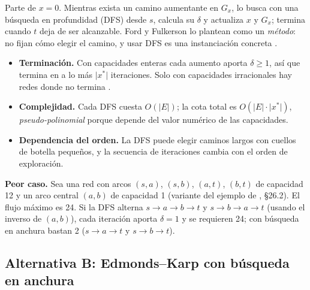 \documentclass[12pt, a4paper]{article}
\begin{document}
Parte de $x = 0$. Mientras exista un camino aumentante en $G_x$, lo busca con una búsqueda en profundidad (DFS) desde $s$, calcula su $\delta$ y actualiza $x$ y $G_x$; termina cuando $t$ deja de ser alcanzable. Ford y Fulkerson \cite{ford1956} lo plantean como un \emph{método}: no fijan cómo elegir el camino, y usar DFS es una instanciación concreta \cite{clrs2009}.
\begin{itemize}
  \item \textbf{Terminación.} Con capacidades enteras cada aumento aporta $\delta \ge 1$, así que termina en a lo más $\lvert x^*\rvert$ iteraciones. Solo con capacidades irracionales hay redes donde no termina \cite{kleinberg2006}.
  \item \textbf{Complejidad.} Cada DFS cuesta $O(\lvert E\rvert)$; la cota total es $O(\lvert E\rvert \cdot \lvert x^*\rvert)$, \emph{pseudo-polinomial} porque depende del valor numérico de las capacidades.
  \item \textbf{Dependencia del orden.} La DFS puede elegir caminos largos con cuellos de botella pequeños, y la secuencia de iteraciones cambia con el orden de exploración.
\end{itemize}
\textbf{Peor caso.} Sea una red con arcos $(s,a)$, $(s,b)$, $(a,t)$, $(b,t)$ de capacidad 12 y un arco central $(a,b)$ de capacidad 1 (variante del ejemplo de \cite{clrs2009}, §26.2). El flujo máximo es 24. Si la DFS alterna $s\to a\to b\to t$ y $s\to b\to a\to t$ (usando el inverso de $(a,b)$), cada iteración aporta $\delta = 1$ y se requieren 24; con búsqueda en anchura bastan 2 ($s\to a\to t$ y $s\to b\to t$).

\subsection{Alternativa B: Edmonds--Karp con búsqueda en anchura}
\end{document}

